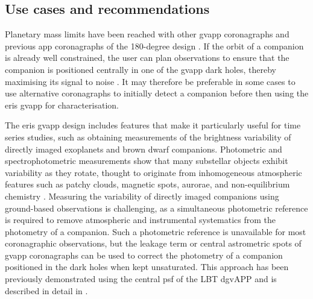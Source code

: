 \documentclass{aa}
\begin{document}
\subsection{Use cases and recommendations}

Planetary mass limits have been reached with other \ac{gvapp} coronagraphs \citep[e.g.][]{2023AJ....165..216L} and previous \ac{app} coronagraphs of the 180-degree design \citep[e.g.][]{2011ApJ...736L..32Q, 2013ApJ...764....7K, 2015MNRAS.453.2378M, 2015MNRAS.453.2533M}.
%
If the orbit of a companion is already well constrained, the user can plan observations to ensure that the companion is positioned centrally in one of the \ac{gvapp} dark holes, thereby maximising its signal to noise \citep[e.g.][]{2010ApJ...722L..49Q, 2021MNRAS.506.3224S}.
%
It may therefore be preferable in some cases to use alternative coronagraphs to initially detect a companion before then using the \ac{eris} \ac{gvapp} for characterisation.

The \ac{eris} \ac{gvapp} design includes features that make it particularly useful for time series studies, such as obtaining measurements of the brightness variability of directly imaged exoplanets and brown dwarf companions.
%
Photometric and spectrophotometric measurements show that many substellar objects exhibit variability as they rotate, thought to originate from inhomogeneous atmospheric features such as patchy clouds, magnetic spots, aurorae, and non-equilibrium chemistry \cite[e.g.][]{2015ApJ...799..154M, 2019MNRAS.483..480V, 2022ApJ...924...68V, 2020AJ....159..125L, 2024MNRAS.532.2207B, 2024MNRAS.527.6624L, 2025MNRAS.539.3758C, 2025SciA...11v3324T, 2026ApJ...997..136O}.
%
Measuring the variability of directly imaged companions using ground-based observations is challenging, as a simultaneous photometric reference is required to remove atmospheric and instrumental systematics from the photometry of a companion.
%
Such a photometric reference is unavailable for most coronagraphic observations, but the leakage term or central astrometric spots of \ac{gvapp} coronagraphs can be used to correct the photometry of a companion positioned in the dark holes when kept unsaturated.
%
This approach has been previously demonstrated using the central \ac{psf} of the LBT dgvAPP and is described in detail in \citet[][]{2023MNRAS.520.4235S, 2024MNRAS.531.2168S, 2025MNRAS.544.3191S}.
\end{document}
